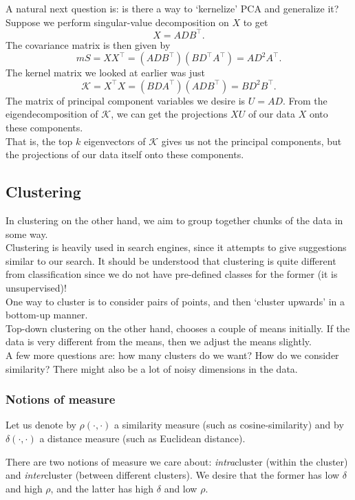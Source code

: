 \documentclass{article}
\begin{document}
			A natural next question is: is there a way to `kernelize' PCA and generalize it? Suppose we perform singular-value decomposition on $X$ to get
			\[ X = ADB^\top. \]
			The covariance matrix is then given by
			\[ mS = XX^\top = (ADB^\top) (BD^\top A^\top) = AD^2A^\top. \]
			The kernel matrix we looked at earlier was just
			\[ \mathcal{K} = X^\top X = (BDA^\top) (ADB^\top) = BD^2B^\top. \]
			The matrix of principal component variables we desire is $U = AD$. From the eigendecomposition of $\mathcal{K}$, we can get the projections $XU$ of our data $X$ onto these components.\\
			That is, the top $k$ eigenvectors of $\mathcal{K}$ gives us not the principal components, but the projections of our data itself onto these components.


	\subsection{Clustering}

		In clustering on the other hand, we aim to group together chunks of the data in some way.\\
		Clustering is heavily used in search engines, since it attempts to give suggestions similar to our search. It should be understood that clustering is quite different from classification since we do not have pre-defined classes for the former (it is unsupervised)!\\

		One way to cluster is to consider pairs of points, and then `cluster upwards' in a bottom-up manner.\\
		Top-down clustering on the other hand, chooses a couple of means initially. If the data is very different from the means, then we adjust the means slightly.\\
		A few more questions are: how many clusters do we want? How do we consider similarity? There might also be a lot of noisy dimensions in the data.\\

		\subsubsection{Notions of measure}

			Let us denote by $\rho(\cdot,\cdot)$ a similarity measure (such as cosine-similarity) and by $\delta(\cdot,\cdot)$ a distance measure (such as Euclidean distance).

			There are two notions of measure we care about: \emph{intra}cluster (within the cluster) and \emph{inter}cluster (between different clusters). We desire that the former has low $\delta$ and high $\rho$, and the latter has high $\delta$ and low $\rho$.\\
\end{document}
